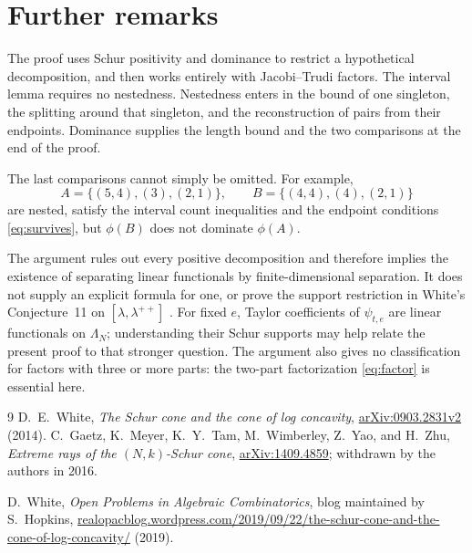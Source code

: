 \documentclass[11pt]{amsart}
\begin{document}
\section{Further remarks}

The proof uses Schur positivity and dominance to restrict a hypothetical
decomposition, and then works entirely with Jacobi--Trudi factors.
The interval lemma requires no nestedness. Nestedness enters in the
bound of one singleton, the splitting around that singleton, and the
reconstruction of pairs from their endpoints. Dominance supplies the
length bound and the two comparisons at the end of the proof.

The last comparisons cannot simply be omitted. For example,
\[
 A=\{(5,4),(3),(2,1)\},\qquad
 B=\{(4,4),(4),(2,1)\}
\]
are nested, satisfy the interval count inequalities and the endpoint
conditions \eqref{eq:survives}, but $\phi(B)$ does not dominate
$\phi(A)$.

The argument rules out every positive decomposition and therefore
implies the existence of separating linear functionals by finite-dimensional
separation. It does not supply an explicit formula for one, or prove the
support restriction in White's Conjecture~11 on
$[\lambda,\lambda^{++}]$ \cite{White}. For fixed $e$, Taylor coefficients
of $\psi_{t,e}$ are linear functionals on $\Lambda_N$; understanding their
Schur supports may help relate the present proof to that stronger question.
The argument also gives no classification for factors with three or more
parts: the two-part factorization \eqref{eq:factor} is essential here.

\begin{thebibliography}{9}
D.~E.~White, \emph{The Schur cone and the cone of log concavity},
\href{https://arxiv.org/abs/0903.2831v2}{arXiv:0903.2831v2} (2014).
C.~Gaetz, K.~Meyer, K.~Y.~Tam, M.~Wimberley, Z.~Yao, and H.~Zhu,
\emph{Extreme rays of the $(N,k)$-Schur cone},
\href{https://arxiv.org/abs/1409.4859}{arXiv:1409.4859};
withdrawn by the authors in 2016.

 D.~White, {\it Open Problems in Algebraic Combinatorics}, blog maintained by S.~Hopkins, \href{https://realopacblog.wordpress.com/2019/09/22/the-schur-cone-and-the-cone-of-log-concavity/}{realopacblog.wordpress.com/2019/09/22/the-schur-cone-and-the-cone-of-log-concavity/} (2019).



\end{thebibliography}
\end{document}

